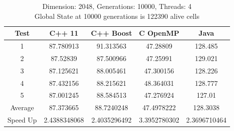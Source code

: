 \documentclass[11pt]{article} %
\begin{document}
\begin{table}[ht]
\caption{Dimension: 2048, Generations: 10000, Threads: 4\\Global State at 10000 generations is 122390 alive cells} %

\centering %

\begin{tabular}{c c c c c} %

\hline\hline %

Test & C++ 11 & C++ Boost & C OpenMP & Java \\ [0.5ex] %


\hline %

1 & 87.780913 & 91.313563 & 47.28809 & 128.485 \\
2 & 87.52839 & 87.500966 & 47.25991 & 129.021 \\
3 & 87.125621 & 88.005461 & 47.300156 & 128.226 \\
4 & 87.432156 & 88.215621 & 48.364031 & 128.777 \\
5 & 87.001245 & 88.584513 & 47.276924 & 127.01 \\
Average & 87.373665 & 88.7240248 & 47.4978222 & 128.3038 \\
Speed Up & 2.4388348068 & 2.4035296492 & 3.3952780302 & 2.3696710464 \\ [1ex]


\hline %
\end{tabular}
\end{table}
\pagebreak
\end{document}
